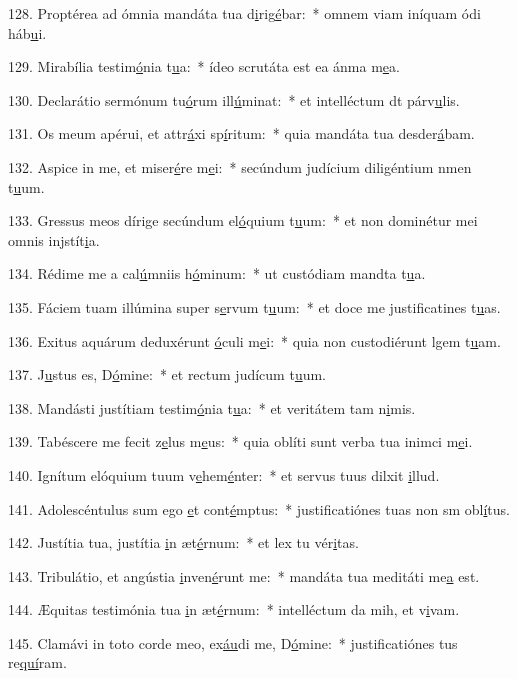 128. Proptérea ad ómnia mandáta tua d\uline{i}rig\uline{é}bar:~* omnem viam iníquam ódi háb\uline{u}i.\par 
129. Mirabília testim\uline{ó}nia t\uline{u}a:~* ídeo scrutáta est ea ánma m\uline{e}a.\par 
130. Declarátio sermónum tu\uline{ó}rum ill\uline{ú}minat:~* et intelléctum dt párv\uline{u}lis.\par 
131. Os meum apérui, et attr\uline{á}xi sp\uline{í}ritum:~* quia mandáta tua desder\uline{á}bam.\par 
132. Aspice in me, et miser\uline{é}re m\uline{e}i:~* secúndum judícium diligéntium nmen t\uline{u}um.\par 
133. Gressus meos dírige secúndum el\uline{ó}quium t\uline{u}um:~* et non dominétur mei omnis injstít\uline{i}a.\par 
134. Rédime me a cal\uline{ú}mniis h\uline{ó}minum:~* ut custódiam mandta t\uline{u}a.\par 
135. Fáciem tuam illúmina super s\uline{e}rvum t\uline{u}um:~* et doce me justificatines t\uline{u}as.\par 
136. Exitus aquárum deduxérunt \uline{ó}culi m\uline{e}i:~* quia non custodiérunt lgem t\uline{u}am.\par 
137. J\uline{u}stus es, D\uline{ó}mine:~* et rectum judícum t\uline{u}um.\par 
138. Mandásti justítiam testim\uline{ó}nia t\uline{u}a:~* et veritátem tam n\uline{i}mis.\par 
139. Tabéscere me fecit z\uline{e}lus m\uline{e}us:~* quia oblíti sunt verba tua inimci m\uline{e}i.\par 
140. Ignítum elóquium tuum v\uline{e}hem\uline{é}nter:~* et servus tuus dilxit \uline{i}llud.\par 
141. Adolescéntulus sum ego \uline{e}t cont\uline{é}mptus:~* justificatiónes tuas non sm obl\uline{í}tus.\par 
142. Justítia tua, justítia \uline{i}n æt\uline{é}rnum:~* et lex tu vér\uline{i}tas.\par 
143. Tribulátio, et angústia \uline{i}nven\uline{é}runt me:~* mandáta tua meditáti me\uline{a} est.\par 
144. Æquitas testimónia tua \uline{i}n æt\uline{é}rnum:~* intelléctum da mih, et v\uline{i}vam.\par 
145. Clamávi in toto corde meo, ex\uline{áu}di me, D\uline{ó}mine:~* justificatiónes tus re\uline{quí}ram.\par 
